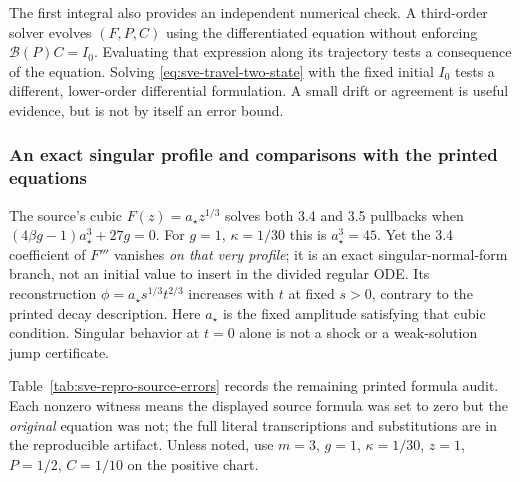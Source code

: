 \documentclass[11pt]{article}
\theoremstyle{definition}
\begin{document}
The first integral also provides an independent numerical check.
A third-order solver evolves $(F,P,C)$ using the differentiated equation
without enforcing $\mathcal B(P)C=I_0$. Evaluating that expression along its
trajectory tests a consequence of the equation. Solving
\eqref{eq:sve-travel-two-state} with the fixed initial $I_0$ tests a
different, lower-order differential formulation. A small drift or
agreement is useful evidence, but is not by itself an error bound.

\subsubsection{An exact singular profile and comparisons with the printed equations}

The source's cubic $F(z)=a_\star z^{1/3}$ solves both 3.4 and 3.5 pullbacks when
$(4\beta g-1)a_\star^3+27g=0$. For $g=1$, $\kappa=1/30$ this is $a_\star^3=45$.
Yet the 3.4 coefficient of $F'''$ vanishes \emph{on that very profile}; it
is an exact singular-normal-form branch, not an initial value to insert in
the divided regular ODE. Its reconstruction
$\phi=a_\star s^{1/3}t^{2/3}$ increases with $t$ at fixed $s>0$, contrary
to the printed decay description. Here $a_\star$ is the fixed amplitude satisfying that cubic condition. Singular behavior at $t=0$ alone is not
a shock or a weak-solution jump certificate.

Table~\ref{tab:sve-repro-source-errors} records the remaining printed
formula audit. Each nonzero witness means the displayed source formula was
set to zero but the \emph{original} equation was not; the full literal
transcriptions and substitutions are in the reproducible artifact. Unless
noted, use $m=3$, $g=1$, $\kappa=1/30$, $z=1$, $P=1/2$, $C=1/10$ on the
positive chart.
\end{document}
